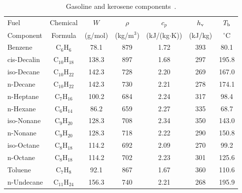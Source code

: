\begin{table}[h!]
\begin{center}
\caption[Gasoline and kerosene components]{Gasoline and kerosene components~\cite{CRCHandbook:Enthalpy_of_Vaporization}.} 
\label{fuelprops2}
\begin{tabular}{|l|c|c|c|c|c|c|} \hline
Fuel        & Chemical          & $W$         & $\rho$      & $c_p$              & $h_{\rm v}$        & $T_{\rm b}$     \\
Component   & Formula           & (g/mol)     & (kg/m$^3$)  & (kJ/(kg$\cdot$K))  & (kJ/kg)            & $^\circ$C       \\
\hline \hline
Benzene     & C$_6$H$_{6}$      & 78.1        & 879         & 1.72              & 393                 & 80.1   \\ \hline
cis-Decalin & C$_{10}$H$_{18}$  & 138.3       & 897         & 1.68              & 297                 & 195.8  \\ \hline
iso-Decane  & C$_{10}$H$_{22}$  & 142.3       & 728         & 2.20              & 269                 & 167.0  \\ \hline
n-Decane    & C$_{10}$H$_{22}$  & 142.3       & 730         & 2.21              & 278                 & 174.1  \\ \hline
n-Heptane   & C$_7$H$_{16}$     & 100.2       & 684         & 2.24              & 317                 & 98.4   \\ \hline
n-Hexane    & C$_6$H$_{14}$     & 86.2        & 659         & 2.27              & 335                 & 68.7   \\ \hline
iso-Nonane  & C$_9$H$_{20}$     & 128.3       & 708         & 2.34              & 350                 & 143.0  \\ \hline
n-Nonane    & C$_9$H$_{20}$     & 128.3       & 718         & 2.22              & 290                 & 150.8  \\ \hline
iso-Octane  & C$_8$H$_{18}$     & 114.2       & 692         & 2.09              & 270                 & 99.2   \\ \hline
n-Octane    & C$_8$H$_{18}$     & 114.2       & 702         & 2.23              & 301                 & 125.6  \\ \hline
Toluene     & C$_7$H$_{8}$      & 92.1        & 867         & 1.67              & 360                 & 110.6  \\ \hline
n-Undecane  & C$_{11}$H$_{24}$  & 156.3       & 740         & 2.21              & 268                 & 195.9  \\ \hline
\end{tabular}
\end{center}
\end{table}


